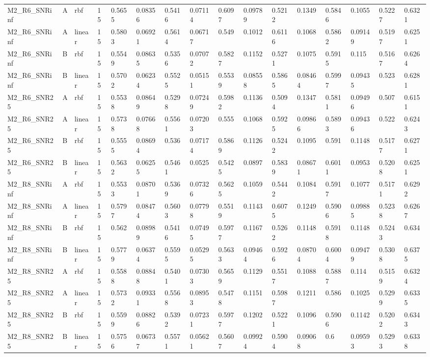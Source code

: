 \begin{tabular}{llllllllllllllll}
M2\_R6\_SNRinf & A & rbf & 15 & 0.5655 & 0.08356 & 0.5416 & 0.07114 & 0.6097 & 0.09789 & 0.5212 & 0.1349 & 0.5846 & 0.1055 & 0.5227 & 0.6321 \\
M2\_R6\_SNRinf & A & linear & 15 & 0.5803 & 0.06921 & 0.5614 & 0.06717 & 0.549 & 0.1012 & 0.6116 & 0.1068 & 0.5862 & 0.09149 & 0.5197 & 0.6251 \\
M2\_R6\_SNRinf & B & rbf & 15 & 0.5549 & 0.08635 & 0.5356 & 0.07072 & 0.5827 & 0.1152 & 0.5271 & 0.1075 & 0.5915 & 0.115 & 0.5167 & 0.6264 \\
M2\_R6\_SNRinf & B & linear & 15 & 0.5702 & 0.06234 & 0.5525 & 0.05151 & 0.5539 & 0.08558 & 0.5865 & 0.08464 & 0.5997 & 0.09435 & 0.523 & 0.6281 \\
M2\_R6\_SNR25 & A & rbf & 15 & 0.5538 & 0.08649 & 0.5298 & 0.07249 & 0.5982 & 0.1136 & 0.5094 & 0.1347 & 0.5811 & 0.09496 & 0.507 & 0.6151 \\
M2\_R6\_SNR25 & A & linear & 15 & 0.5738 & 0.07668 & 0.5561 & 0.07203 & 0.555 & 0.1068 & 0.5925 & 0.09866 & 0.5893 & 0.09436 & 0.522 & 0.6243 \\
M2\_R6\_SNR25 & B & rbf & 15 & 0.5555 & 0.08694 & 0.536 & 0.07174 & 0.5869 & 0.1126 & 0.5242 & 0.1095 & 0.591 & 0.1148 & 0.5177 & 0.6271 \\
M2\_R6\_SNR25 & B & linear & 15 & 0.5632 & 0.06255 & 0.5461 & 0.0525 & 0.5425 & 0.0897 & 0.5839 & 0.08671 & 0.6011 & 0.0953 & 0.5208 & 0.6251 \\
M2\_R8\_SNRinf & A & rbf & 15 & 0.5533 & 0.08701 & 0.5369 & 0.07326 & 0.5625 & 0.1059 & 0.5442 & 0.1084 & 0.5917 & 0.1077 & 0.5171 & 0.6292 \\
M2\_R8\_SNRinf & A & linear & 15 & 0.5797 & 0.08474 & 0.5603 & 0.07798 & 0.5519 & 0.1143 & 0.6075 & 0.1249 & 0.5906 & 0.09885 & 0.5238 & 0.6267 \\
M2\_R8\_SNRinf & B & rbf & 15 & 0.562 & 0.08989 & 0.5416 & 0.07495 & 0.5977 & 0.1167 & 0.5262 & 0.1148 & 0.5918 & 0.1148 & 0.5243 & 0.634 \\
M2\_R8\_SNRinf & B & linear & 15 & 0.5779 & 0.06374 & 0.5595 & 0.05295 & 0.5633 & 0.09464 & 0.5926 & 0.08704 & 0.6004 & 0.09479 & 0.5308 & 0.6375 \\
M2\_R8\_SNR25 & A & rbf & 15 & 0.5588 & 0.08848 & 0.5401 & 0.07303 & 0.5659 & 0.1129 & 0.5517 & 0.1088 & 0.5887 & 0.114 & 0.5159 & 0.6324 \\
M2\_R8\_SNR25 & A & linear & 15 & 0.5732 & 0.09331 & 0.5568 & 0.08953 & 0.5478 & 0.1151 & 0.5987 & 0.1211 & 0.586 & 0.1025 & 0.5299 & 0.6335 \\
M2\_R8\_SNR25 & B & rbf & 15 & 0.5599 & 0.08826 & 0.5392 & 0.07231 & 0.5977 & 0.1202 & 0.5221 & 0.1096 & 0.5906 & 0.1142 & 0.5202 & 0.6343 \\
M2\_R8\_SNR25 & B & linear & 15 & 0.5756 & 0.06737 & 0.5571 & 0.05621 & 0.5607 & 0.09924 & 0.5904 & 0.09068 & 0.6 & 0.09593 & 0.5293 & 0.6338 \\
\hline
\end{tabular}
